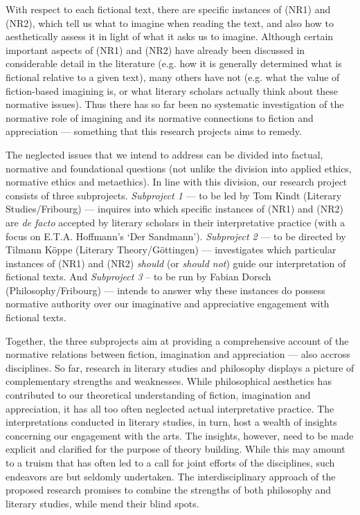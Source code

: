\noindent With respect to each fictional text, there are specific instances of (NR1) and (NR2), which tell us what to imagine when reading the text, and also how to aesthetically assess it in light of what it asks us to imagine. Although certain important aspects of (NR1) and (NR2) have already been discussed in considerable detail in the literature (e.g. how it is generally determined what is fictional relative to a given text), many others have not (e.g. what the value of fiction-based imagining is, or what literary scholars actually think about these normative issues). Thus there has so far been no systematic investigation of the normative role of imagining and its normative connections to fiction and appreciation --- something that this research projects aims to remedy. 

The neglected issues that we intend to address can be divided into factual, normative and foundational questions (not unlike the division into applied ethics, normative ethics and metaethics). In line with this division, our research project consists of three subprojects. \emph{Subproject 1} --- to be led by Tom Kindt (Literary Studies/Fribourg) --- inquires into which specific instances of (NR1) and (NR2) are \emph{de facto} accepted by literary scholars in their interpretative practice (with a focus on E.T.A. Hoffmann's `Der Sandmann'). \emph{Subproject 2} --- to be directed by Tilmann K\"oppe (Literary Theory/G\"ottingen) --- investigates which particular instances of (NR1) and (NR2) \emph{should} (or \emph{should not}) guide our interpretation of fictional texts. And \emph{Subproject 3} -- to be run by Fabian Dorsch (Philosophy/Fribourg) --- intends to answer why these instances do possess normative authority over our imaginative and appreciative engagement with fictional texts. 

Together, the three subprojects aim at providing a comprehensive account of the normative relations between fiction, imagination and appreciation --- also accross disciplines. So far, research in literary studies and philosophy displays a picture of complementary strengths and weaknesses. While philosophical aesthetics has contributed to our theoretical understanding of fiction, imagination and appreciation, it has all too often neglected actual interpretative practice. The interpretations conducted in literary studies, in turn, host a wealth of insights concerning our engagement with the arts. The insights, however, need to be made explicit and clarified for the purpose of theory building. While this may amount to a truism that has often led to a call for joint efforts of the disciplines, such endeavors are but seldomly undertaken. The interdisciplinary approach of the proposed research promises to combine the strengths of both philosophy and literary studies, while mend their blind spots. 

\pagebreak